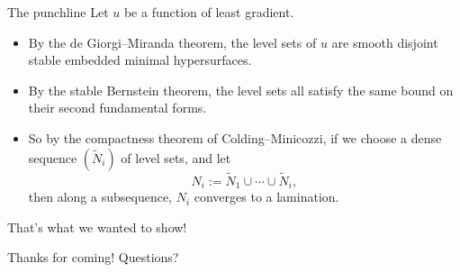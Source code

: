 \documentclass[10pt]{beamer}
\begin{document}
\begin{frame}{The punchline}
Let $u$ be a function of least gradient.

\begin{itemize}
\item By the de Giorgi--Miranda theorem, the level sets of $u$ are smooth disjoint stable embedded minimal hypersurfaces.
\item By the stable Bernstein theorem, the level sets all satisfy the same bound on their second fundamental forms.
\item So by the compactness theorem of Colding--Minicozzi, if we choose a dense sequence $(\tilde N_i)$ of level sets, and let
$$N_i := \tilde N_1 \cup \cdots \cup \tilde N_i,$$
then along a subsequence, $N_i$ converges to a lamination.
\end{itemize}

That's what we wanted to show!
\end{frame}

\begin{frame}{Thanks for coming!}
Questions?
\end{frame}
\end{document}
